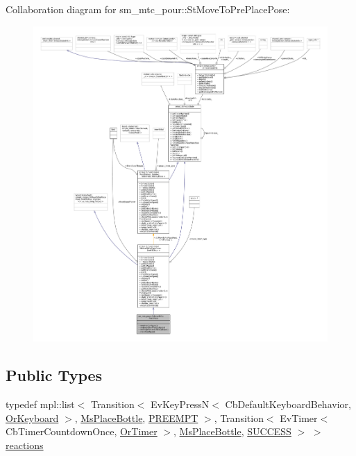 Collaboration diagram for sm\+\_\+mtc\+\_\+pour\+:\+:St\+Move\+To\+Pre\+Place\+Pose\+:
\nopagebreak
\begin{figure}[H]
\begin{center}
\leavevmode
\includegraphics[width=350pt]{structsm__mtc__pour_1_1StMoveToPrePlacePose__coll__graph}
\end{center}
\end{figure}
\subsection*{Public Types}
\begin{DoxyCompactItemize}
\item 
typedef mpl\+::list$<$ Transition$<$ Ev\+Key\+PressN$<$ Cb\+Default\+Keyboard\+Behavior, \hyperlink{classsm__mtc__pour_1_1OrKeyboard}{Or\+Keyboard} $>$, \hyperlink{classsm__mtc__pour_1_1MsPlaceBottle}{Ms\+Place\+Bottle}, \hyperlink{classPREEMPT}{P\+R\+E\+E\+M\+PT} $>$, Transition$<$ Ev\+Timer$<$ Cb\+Timer\+Countdown\+Once, \hyperlink{classsm__mtc__pour_1_1OrTimer}{Or\+Timer} $>$, \hyperlink{classsm__mtc__pour_1_1MsPlaceBottle}{Ms\+Place\+Bottle}, \hyperlink{classSUCCESS}{S\+U\+C\+C\+E\+SS} $>$ $>$ \hyperlink{structsm__mtc__pour_1_1StMoveToPrePlacePose_af46dda752789a8cf4775a2399e84822f}{reactions}
\end{DoxyCompactItemize}
